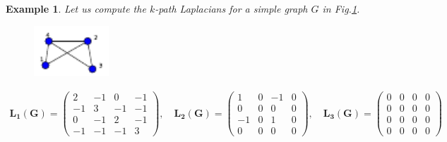\documentclass[10pt,a4paper]{article}
\newtheorem{exa}{Example}
\begin{document}
    	    \begin{exa}
    	    	Let us compute the $k$-path Laplacians for a simple graph $G$ in Fig.\ref{spanning}.
    	    	
    	    	\begin{figure}[H]
    	    		\centering
    	    		\includegraphics[width=0.25\textwidth]{images/compute-spanning.pdf}
    	    		\label{spanning}
    	    	\end{figure}
    	    	
    	    	\begin{eqnarray*}
    	    		\mathbf{L_1(G)} = \begin{pmatrix}
    	    			2 & -1 & 0 & -1 \\
    	    			-1 & 3 & -1 & -1 \\
    	    			0 & -1 & 2 & -1  \\
    	    			-1 & -1 & -1 & 3
    	    		\end{pmatrix}, \quad
    	    		\mathbf{L_2(G)} = \begin{pmatrix}
    	    			1 & 0 & -1 & 0 \\
    	    			0 & 0 & 0 & 0 \\
    	    			-1 & 0 & 1 & 0 \\
    	    			0 & 0 & 0 & 0
    	    		\end{pmatrix}, \quad
    	    		\mathbf{L_3(G)} = \begin{pmatrix}
    	    			0 & 0 & 0 & 0 \\
    	    			0 & 0 & 0 & 0 \\
    	    			0 & 0 & 0 & 0 \\
    	    			0 & 0 & 0 & 0
    	    		\end{pmatrix}
    	    	\end{eqnarray*}\\
    	    \end{exa}
    	    
    	    
\end{document}
